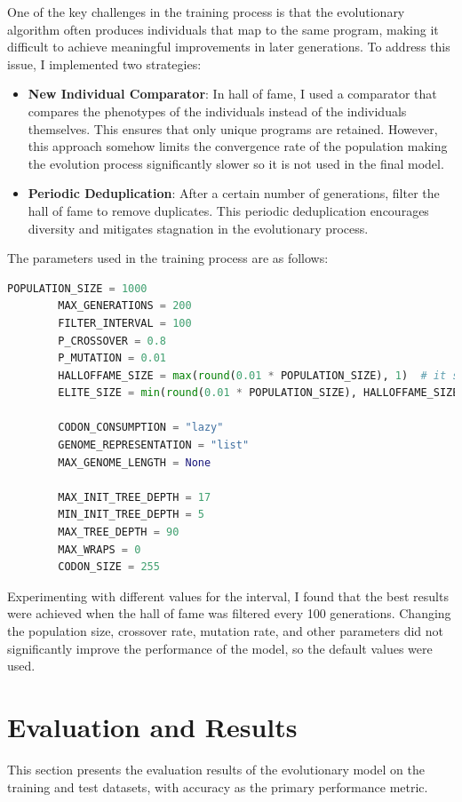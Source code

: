 \documentclass{article}
\begin{document}
    One of the key challenges in the training process is that the evolutionary algorithm often produces individuals that map to the same program, making it difficult to achieve meaningful improvements in later generations. To address this issue, I implemented two strategies:
    \begin{itemize}
        \item \textbf{New Individual Comparator}: In hall of fame, I used a comparator that compares the phenotypes of the individuals instead of the individuals themselves. This ensures that only unique programs are retained. However, this approach somehow limits the convergence rate of the population making the evolution process significantly slower so it is not used in the final model.
        \item \textbf{Periodic Deduplication}: After a certain number of generations, filter the hall of fame to remove duplicates. This periodic deduplication encourages diversity and mitigates stagnation in the evolutionary process.
    \end{itemize}

    The parameters used in the training process are as follows:
    \begin{lstlisting}[language=Python, caption={Configuration Parameters for Evolutionary Algorithm}, label={lst:config}]
        POPULATION_SIZE = 1000
        MAX_GENERATIONS = 200
        FILTER_INTERVAL = 100
        P_CROSSOVER = 0.8
        P_MUTATION = 0.01
        HALLOFFAME_SIZE = max(round(0.01 * POPULATION_SIZE), 1)  # it should be at least 1
        ELITE_SIZE = min(round(0.01 * POPULATION_SIZE), HALLOFFAME_SIZE)
        
        CODON_CONSUMPTION = "lazy"
        GENOME_REPRESENTATION = "list"
        MAX_GENOME_LENGTH = None
        
        MAX_INIT_TREE_DEPTH = 17
        MIN_INIT_TREE_DEPTH = 5
        MAX_TREE_DEPTH = 90
        MAX_WRAPS = 0
        CODON_SIZE = 255
    \end{lstlisting}
    Experimenting with different values for the interval, I found that the best results were achieved when the hall of fame was filtered every 100 generations.
    Changing the population size, crossover rate, mutation rate, and other parameters did not significantly improve the performance of the model, so the default values were used.
        

\section{Evaluation and Results}
This section presents the evaluation results of the evolutionary model on the training and test datasets, with accuracy as the primary performance metric.
\end{document}
